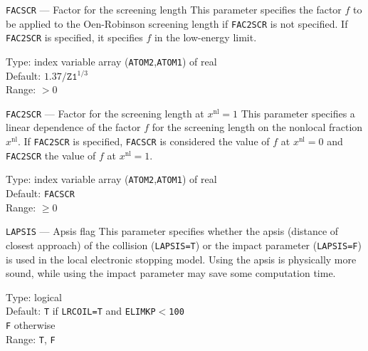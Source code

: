 \begin{keydescription}{\texttt{FACSCR} --- Factor for the screening length}
%
  This parameter specifies the factor $f$ to be applied to the
  Oen-Robinson screening length if \texttt{FAC2SCR} is not specified.
  If \texttt{FAC2SCR} is specified, it specifies $f$ in the low-energy
  limit.
  \begin{keytab}
    Type:    \> index variable array (\texttt{ATOM2},\texttt{ATOM1}) 
                of real \\
    Default: \> $1.37 / \texttt{Z1}^{1/3}$ \\
    Range:   \> $> 0$
\end{keytab}
\end{keydescription}

\begin{keydescription}{\texttt{FAC2SCR} --- Factor for the screening length
  at $x^\mathrm{nl}=1$}
%
  This parameter specifies a linear dependence of the factor $f$ for the 
  screening length on the nonlocal fraction $x^\mathrm{nl}$. If 
  \texttt{FAC2SCR} is specified, \texttt{FACSCR} is considered the value 
  of $f$ at $x^\mathrm{nl} = 0$ and \texttt{FAC2SCR} the value 
  of $f$ at $x^\mathrm{nl} = 1$. 
  \begin{keytab}
    Type:    \> index variable array (\texttt{ATOM2},\texttt{ATOM1}) 
                of real \\
    Default: \> \texttt{FACSCR} \\
    Range:   \> $\ge 0$
  \end{keytab}
\end{keydescription}

\begin{keydescription}{\texttt{LAPSIS} --- Apsis flag}
%
  This parameter specifies whether the apsis (distance of closest
  approach) of the collision (\texttt{LAPSIS=T}) or the impact
  parameter (\texttt{LAPSIS=F}) is used in the local electronic
  stopping model. Using the apsis is physically more sound, while using the
  impact parameter may save some computation time.
  \begin{keytab}
    Type:    \> logical \\
    Default: \> \texttt{T} if \texttt{LRCOIL=T} and \texttt{ELIMKP$<$100} \\
             \> \texttt{F} otherwise \\
    Range:   \> \texttt{T}, \texttt{F}
  \end{keytab}
\end{keydescription}

